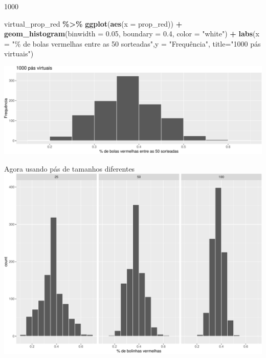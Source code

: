 \documentclass[
  9pt,
  ignorenonframetext,
  aspectratio=169]{beamer}
\newenvironment{Shaded}{\begin{snugshade}}{\end{snugshade}}
\newcommand{\DataTypeTok}[1]{\textcolor[rgb]{0.13,0.29,0.53}{#1}}
\newcommand{\FloatTok}[1]{\textcolor[rgb]{0.00,0.00,0.81}{#1}}
\newcommand{\KeywordTok}[1]{\textcolor[rgb]{0.13,0.29,0.53}{\textbf{#1}}}
\newcommand{\NormalTok}[1]{#1}
\newcommand{\OperatorTok}[1]{\textcolor[rgb]{0.81,0.36,0.00}{\textbf{#1}}}
\newcommand{\StringTok}[1]{\textcolor[rgb]{0.31,0.60,0.02}{#1}}
\begin{document}
\begin{frame}[fragile]{1000}
\protect\hypertarget{section-3}{}
\begin{Shaded}
\begin{Highlighting}[]
\NormalTok{virtual\_prop\_red }\OperatorTok{\%\textgreater{}\%}\StringTok{ }\KeywordTok{ggplot}\NormalTok{(}\KeywordTok{aes}\NormalTok{(}\DataTypeTok{x =}\NormalTok{ prop\_red)) }\OperatorTok{+}
\StringTok{  }\KeywordTok{geom\_histogram}\NormalTok{(}\DataTypeTok{binwidth =} \FloatTok{0.05}\NormalTok{, }\DataTypeTok{boundary =} \FloatTok{0.4}\NormalTok{, }\DataTypeTok{color =} \StringTok{"white"}\NormalTok{) }\OperatorTok{+}
\StringTok{  }\KeywordTok{labs}\NormalTok{(}\DataTypeTok{x =} \StringTok{"\% de bolas vermelhas entre as 50 sorteadas"}\NormalTok{,}\DataTypeTok{y =} \StringTok{"Frequência"}\NormalTok{,}
       \DataTypeTok{title=}\StringTok{"1000 pás virtuais"}\NormalTok{) }
\end{Highlighting}
\end{Shaded}

\includegraphics{aula_09_files/figure-beamer/unnamed-chunk-9-1.pdf}
\end{frame}

\begin{frame}{Agora usando pás de tamanhos diferentes}
\protect\hypertarget{agora-usando-puxe1s-de-tamanhos-diferentes}{}
\includegraphics{aula_09_files/figure-beamer/unnamed-chunk-10-1.pdf}
\end{frame}
\end{document}
